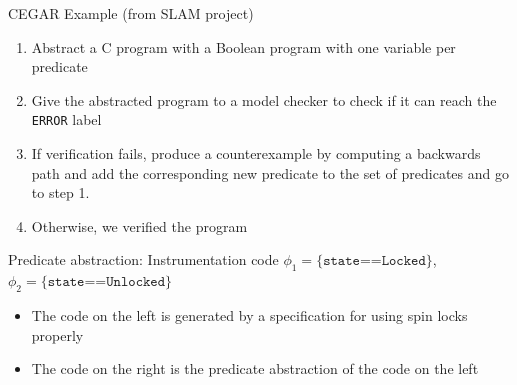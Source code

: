 \documentclass[aspectratio=169,notes]{beamer}
\begin{document}
\begin{frame}{CEGAR Example (from SLAM project)}
  \footnotesize
  \begin{enumerate}[<+->]
  \item Abstract a C program with a Boolean program with one variable per predicate
  \item Give the abstracted program to a model checker to check if it can reach the \texttt{ERROR} label
  \item If verification fails, produce a counterexample by computing a backwards path and add the corresponding new predicate to the set of predicates and go to step 1.
  \item Otherwise, we verified the program
  \end{enumerate}
\end{frame}

\begin{frame}{Predicate abstraction: Instrumentation code}
  \begingroup\footnotesize
  $\phi_1 = \texttt{\{state==Locked\}}$, $\phi_2 = \texttt{\{state==Unlocked\}}$

  \begin{itemize}[<+->]
  \item The code on the left is generated by a specification for using
    spin locks properly
  \item The code on the right is the predicate abstraction of the code on the left
  \end{itemize}
  \endgroup
  
  \begin{columns}[t]
    \begin{column}{0.45\textwidth}
      
    \end{column}
    \begin{column}{0.45\textwidth}
      
    \end{column}
  \end{columns}
\end{frame}
\end{document}
